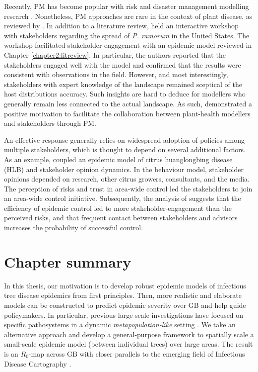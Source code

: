 Recently, PM has become popular with risk and disaster management modelling research \cite{hamalainen2020leadership, ravera2020participatory, hedelin2017participatory}.
Nonetheless, PM approaches are rare in the context of plant disease, as reviewed by \cite{gaydos2019forecasting}.
In addition to a literature review, \cite{gaydos2019forecasting} held an interactive workshop with stakeholders
regarding the spread of \textit{P. ramorum} in the United States. The workshop facilitated stakeholder engagement
with an epidemic model \cite{tonini2017tangible}\textemdash reviewed in Chapter \ref{chapter2:litreview}. In particular, the authors reported
that the stakeholders engaged well with the model and confirmed that the results were consistent with observations in the field. However, and most interestingly, stakeholders with expert knowledge of the landscape remained sceptical of the host distributions accuracy. 
Such insights are hard to deduce for modellers who generally remain less connected to the actual landscape. 
As such, \cite{tonini2017tangible} demonstrated a positive motivation to facilitate the collaboration 
between plant-health modellers and stakeholders through PM.

An effective response generally relies on widespread adoption of policies among multiple 
stakeholders, which is thought to depend on several additional factors. As an example, \cite{milne2020makes} coupled
an epidemic model of citrus huanglongbing disease (HLB) and stakeholder opinion dynamics. In the behaviour model, stakeholder
opinions depended on research, other citrus growers, consultants, and the media. The perception of risks and trust in
area-wide control led the stakeholders to join an area-wide control initiative. Subsequently, the analysis of 
\cite{milne2020makes} suggests that the efficiency of epidemic control led to more stakeholder-engagement than the perceived risks, and that frequent contact between stakeholders and advisors increases the probability of successful control.

\newpage

\section{Chapter summary}

In this thesis, our motivation is to develop robust epidemic models of infectious tree disease
epidemics from first principles. Then, more realistic and elaborate models can be constructed to
predict epidemic severity over GB and help guide policymakers. 
In particular, previous large-scale investigations
have focused on specific pathosystems in a dynamic \textit{metapopulation-like} setting
\cite{large-scale-control, meentemeyer2011epidemiological, harwood2009epidemiological}. We take
an alternative approach and develop a general-purpose framework to spatially scale a small-scale epidemic
model (between individual trees) over large areas. The result is an $R_0$-map across GB with closer parallels
to the emerging field of Infectious Disease Cartography \cite{otieno2021modeling, KRAEMER201619, messina2016mapping}.

